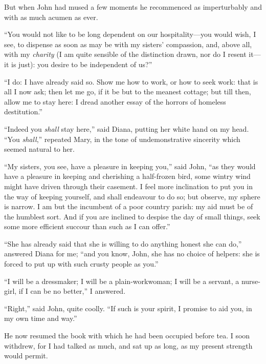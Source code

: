 But when \St{} John had mused a few moments he recommenced as
imperturbably and with as much acumen as ever.

\enquote{You would not like to be long dependent on our hospitality---you would
wish, I see, to dispense as soon as may be with my sisters' compassion,
and, above all, with my \emph{charity} (I am quite sensible of the
distinction drawn, nor do I resent it---it is just): you desire to be
independent of us?}

\enquote{I do: I have already said so. Show me how to work, or how to
seek work: that is all I now ask; then let me go, if it be but to the
meanest cottage; but till then, allow me to stay here: I dread another
essay of the horrors of homeless destitution.}

\enquote{Indeed you \emph{shall} stay here,} said Diana, putting her white
hand on my head. \enquote{You \emph{shall},} repeated Mary, in the tone of
undemonstrative sincerity which seemed natural to her.

\enquote{My sisters, you see, have a pleasure in keeping you,} said \Mr{}
\St{} John, \enquote{as they would have a pleasure in keeping and
cherishing a half-frozen bird, some wintry wind might have driven
through their casement. I feel more inclination to put you in the way
of keeping yourself, and shall endeavour to do so; but observe, my
sphere is narrow. I am but the incumbent of a poor country parish: my
aid must be of the humblest sort. And if you are inclined to despise
the day of small things, seek some more efficient succour than such as I
can offer.}

\enquote{She has already said that she is willing to do anything honest
she can do,} answered Diana for me; \enquote{and you know, \St{} John, she
has no choice of helpers: she is forced to put up with such crusty
people as you.}

\enquote{I will be a dressmaker; I will be a plain-workwoman; I will be
a servant, a nurse-girl, if I can be no better,} I answered.

\enquote{Right,} said \Mr{} \St{} John, quite coolly. \enquote{If such is
your spirit, I promise to aid you, in my own time and way.}

He now resumed the book with which he had been occupied before tea. I
soon withdrew, for I had talked as much, and sat up as long, as my
present strength would permit.
